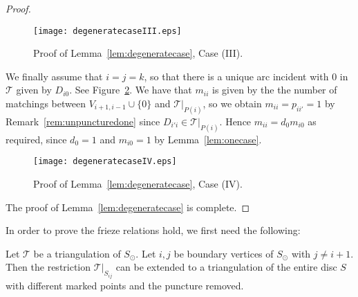 \documentclass[a4paper]{amsart}
\begin{document}
\begin{proof}
\begin{figure}
\begin{center}
\texttt{[image: degeneratecaseIII.eps]}
\caption{Proof of Lemma~\ref{lem:degeneratecase}, Case (III).}
\label{fig:degeneratecaseIII}
\end{center}
\end{figure}

We finally assume that $i=j=k$, so that there is a unique arc incident
with $0$ in ${\mathcal T}$ given by $D_{i0}$.
See Figure~\ref{fig:degeneratecaseIV}.
We have that $m_{ii}$ is given by the
the number of matchings between $V_{i+1,i-1}\cup \{0\}$ and ${\mathcal T}|_{P(i)}$,
so we obtain $m_{ii}=p_{ii'}=1$ by Remark~\ref{rem:unpuncturedone}
since $D_{i'i}\in {\mathcal T}|_{P(i)}$.
Hence $m_{ii}=d_0m_{i0}$ as required, since $d_0=1$ and $m_{i0}=1$
by Lemma~\ref{lem:onecase}.

\begin{figure}
\begin{center}
\texttt{[image: degeneratecaseIV.eps]}
\caption{Proof of Lemma~\ref{lem:degeneratecase}, Case (IV).}
\label{fig:degeneratecaseIV}
\end{center}
\end{figure}

The proof of Lemma~\ref{lem:degeneratecase} is complete.
\end{proof}

In order to prove the frieze relations hold, we first need the following:

\begin{lemma} \label{lem:extension}
Let ${\mathcal T}$ be a triangulation of $S_{\odot}$.
Let $i,j$ be boundary vertices of $S_{\odot}$ with $j\neq i+1$.
Then the restriction ${\mathcal T}|_{S_{ij}}$ can be extended to a
triangulation of the entire disc $S$ with different marked points and
the puncture removed.
\end{lemma}
\end{document}
